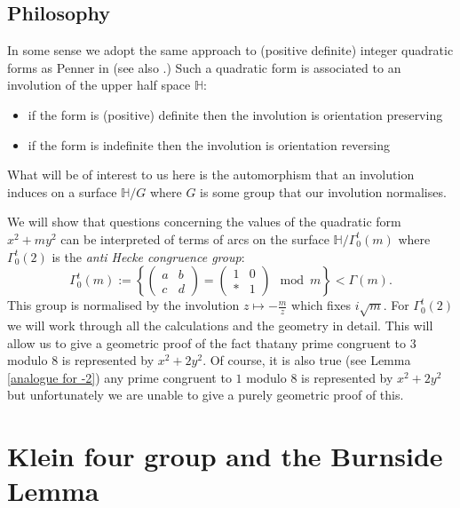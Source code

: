 \documentclass[12pt,a4paper]{amsart}
\def\ah{\Gamma_0^t(2)}
\begin{document}
\subsection{Philosophy}

In some sense we adopt the same approach to (positive definite) integer quadratic forms as
Penner in \cite{} (see also \cite{springborn1}.)
Such a
quadratic form is associated to an involution of the upper half
space $\mathbb{H}$: 
\begin{itemize}
	\item if the form is (positive) definite then the involution is orientation preserving 
	\item if the form is indefinite then the involution is
		orientation reversing 
\end{itemize}

What will be of interest to us here is the automorphism 
that an involution induces on a surface $\mathbb{H}/G$
where $G$ is some group that our involution normalises.

We will show that questions concerning the values of the quadratic form $x^2
+ m y^2$ can be interpreted of terms of arcs on the surface
$\mathbb{H}/\Gamma^t_0(m)$ where
$\ah$ is the 
\textit{anti Hecke congruence group}:
$$ \Gamma^t_0(m) := \left \{ \begin{pmatrix} a & b \\ c & d \end{pmatrix} = 
\begin{pmatrix} 1 & 0 \\ * & 1 \end{pmatrix} \mod m \right \} <
\Gamma(m).$$
This group is 
normalised by the involution $z\mapsto -\frac{m}{z}$
which fixes $i\sqrt{m}$.
For $\Gamma^t_0(2)$  we will work through all the calculations and
the geometry in detail.
This will allow us to give a geometric proof of the fact thatany
prime congruent to $3$ modulo 8 is represented by $x^2 + 2y^2$.
Of course, it is also true (see Lemma \ref{analogue for -2})
	any
prime congruent to $1$ modulo 8 is represented by $x^2 + 2y^2$ but
unfortunately we are unable to give a purely geometric proof of
this.




\section{Klein four group and the Burnside Lemma}
\end{document}
